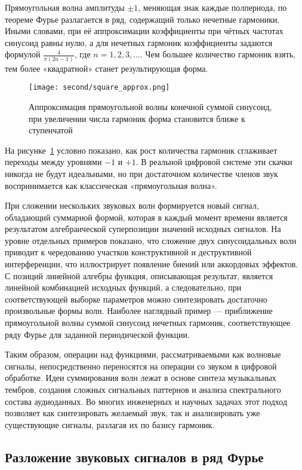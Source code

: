 \documentclass[bachelor, och, diploma]{SCWorks}
\begin{document}
Прямоугольная волна амплитуды \(\pm1\), меняющая знак каждые полпериода, по теореме Фурье разлагается в ряд, содержащий только нечетные гармоники. Иными словами, при её аппроксимации коэффициенты при чётных частотах синусоид равны нулю, а для нечетных гармоник коэффициенты задаются формулой \(\frac{4}{\pi(2n-1)}\), где \(n = 1, 2, 3, ...\). Чем большее количество гармоник взять, тем более «квадратной» станет результирующая форма.

\begin{figure}[h!]
\centering
\texttt{[image: second/square\_approx.png]}
\caption{Аппроксимация прямоугольной волны конечной суммой синусоид, при увеличении числа гармоник форма становится ближе к ступенчатой}
\label{fig:square_approx}
\end{figure}

На рисунке~\ref{fig:square_approx} условно показано, как рост количества гармоник сглаживает переходы между уровнями \(-1\) и \(+1\). В реальной цифровой системе эти скачки никогда не будут идеальными, но при достаточном количестве членов звук воспринимается как классическая «прямоугольная волна».

При сложении нескольких звуковых волн формируется новый сигнал, обладающий суммарной формой, которая в каждый момент времени является результатом алгебраической суперпозиции значений исходных сигналов. На уровне отдельных примеров показано, что сложение двух синусоидальных волн приводит к чередованию участков конструктивной и деструктивной интерференции, что иллюстрирует появление биений или аккордовых эффектов. С позиций линейной алгебры функция, описывающая результат, является линейной комбинацией исходных функций, а следовательно, при соответствующей выборке параметров можно синтезировать достаточно произвольные формы волн. Наиболее наглядный пример --- приближение прямоугольной волны суммой синусоид нечетных гармоник, соответствующее ряду Фурье для заданной периодической функции.

Таким образом, операции над функциями, рассматриваемыми как волновые сигналы, непосредственно переносятся на операции со звуком в цифровой обработке. Идеи суммирования волн лежат в основе синтеза музыкальных тембров, создания сложных сигнальных паттернов и анализа спектрального состава аудиоданных. Во многих инженерных и научных задачах этот подход позволяет как синтезировать желаемый звук, так и анализировать уже существующие сигналы, разлагая их по базису гармоник.

\subsection{Разложение звуковых сигналов в ряд Фурье}
\end{document}
